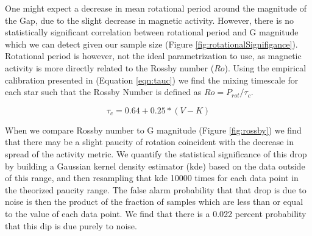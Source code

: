 {\footnotesize
  
}

One might expect a decrease in mean rotational period around the magnitude of
the Gap, due to the slight decrease in magnetic activity. However, there is no
statistically significant correlation between rotational period and G
magnitude which we can detect given our sample size (Figure
\ref{fig:rotationalSignifigance}). Rotational period is however, not the ideal
parametrization to use, as magnetic activity is more directly related to the
Rossby number ($Ro$). Using the empirical calibration presented in
\citet{Wright2018} (Equation \ref{eqn:tauc}) we find the mixing timescale for
each star such that the Rossby Number is defined as $Ro = P_{rot}/\tau_{c}$.

\begin{equation}\label{eqn:tauc}
  \tau_{c} = 0.64 + 0.25 * (V-K)
\end{equation}

When we compare Rossby number to G magnitude (Figure \ref{fig:rossby}) we find
that there may be a slight paucity of rotation coincident with the decrease in
spread of the activity metric. We quantify the statistical significance of this
drop by building a Gaussian kernel density estimator (kde) based on the data
outside of this range, and then resampling that kde 10000 times for each data
point in the theorized paucity range. The false alarm probability that that drop
is due to noise is then the product of the fraction of samples which are less
than or equal to the value of each data point. We find that there is a 0.022
percent probability that this dip is due purely to noise.


